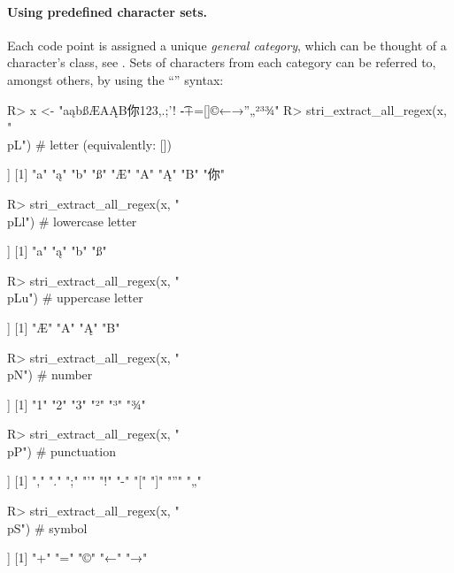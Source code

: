 \documentclass[nojss]{jss}
\begin{document}
\paragraph{Using predefined character sets.}
Each code point is assigned a unique \textit{general category},
which can be thought of a character's class,
see \citep{usa44:ucd}.
Sets of characters from each category can be referred to,
amongst others, by using the ``'' syntax:

\begin{Schunk}
\begin{Sinput}
R> x <- "aąbßÆAĄB你123,.;'! \t-+=[]©←→”„²³¾"
R> stri_extract_all_regex(x, "\\p{L}")   # letter (equivalently: [])
\end{Sinput}
\begin{Soutput}
[[1]]
[1] "a"  "ą"  "b"  "ß"  "Æ"  "A"  "Ą"  "B"  "你"
\end{Soutput}
\begin{Sinput}
R> stri_extract_all_regex(x, "\\p{Ll}")  # lowercase letter
\end{Sinput}
\begin{Soutput}
[[1]]
[1] "a" "ą" "b" "ß"
\end{Soutput}
\begin{Sinput}
R> stri_extract_all_regex(x, "\\p{Lu}")  # uppercase letter
\end{Sinput}
\begin{Soutput}
[[1]]
[1] "Æ" "A" "Ą" "B"
\end{Soutput}
\begin{Sinput}
R> stri_extract_all_regex(x, "\\p{N}")   # number
\end{Sinput}
\begin{Soutput}
[[1]]
[1] "1" "2" "3" "²" "³" "¾"
\end{Soutput}
\begin{Sinput}
R> stri_extract_all_regex(x, "\\p{P}")   # punctuation
\end{Sinput}
\begin{Soutput}
[[1]]
 [1] "," "." ";" "'" "!" "-" "[" "]" "”" "„"
\end{Soutput}
\begin{Sinput}
R> stri_extract_all_regex(x, "\\p{S}")   # symbol
\end{Sinput}
\begin{Soutput}
[[1]]
[1] "+" "=" "©" "←" "→"
\end{Soutput}
\end{Schunk}
\end{document}
